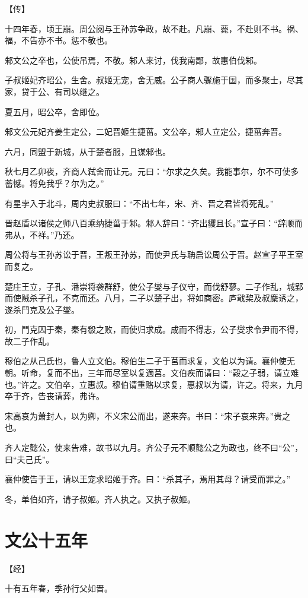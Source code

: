 \documentclass[a4paper,12pt,UTF8,twoside]{ctexbook}
\begin{document}
【传】

十四年春，顷王崩。周公阅与王孙苏争政，故不赴。凡崩、薨，不赴则不书。祸、福，不告亦不书。惩不敬也。

邾文公之卒也，公使吊焉，不敬。邾人来讨，伐我南鄙，故惠伯伐邾。

子叔姬妃齐昭公，生舍。叔姬无宠，舍无威。公子商人骤施于国，而多聚士，尽其家，贷于公、有司以继之。

夏五月，昭公卒，舍即位。

邾文公元妃齐姜生定公，二妃晋姬生捷菑。文公卒，邾人立定公，捷菑奔晋。

六月，同盟于新城，从于楚者服，且谋邾也。

秋七月乙卯夜，齐商人弑舍而让元。元曰：“尔求之久矣。我能事尔，尔不可使多蓄憾。将免我乎？尔为之。”

有星孛入于北斗，周内史叔服曰：“不出七年，宋、齐、晋之君皆将死乱。”

晋赵盾以诸侯之师八百乘纳捷菑于邾。邾人辞曰：“齐出貜且长。”宣子曰：“辞顺而弗从，不祥。”乃还。

周公将与王孙苏讼于晋，王叛王孙苏，而使尹氏与聃启讼周公于晋。赵宣子平王室而复之。

楚庄王立，子孔、潘崇将袭群舒，使公子燮与子仪守，而伐舒蓼。二子作乱，城郢而使贼杀子孔，不克而还。八月，二子以楚子出，将如商密。庐戢棃及叔麇诱之，遂杀鬥克及公子燮。

初，鬥克囚于秦，秦有殽之败，而使归求成。成而不得志，公子燮求令尹而不得，故二子作乱。

穆伯之从己氏也，鲁人立文伯。穆伯生二子于莒而求复，文伯以为请。襄仲使无朝。听命，复而不出，三年而尽室以复適莒。文伯疾而请曰：“穀之子弱，请立难也。”许之。文伯卒，立惠叔。穆伯请重赂以求复，惠叔以为请，许之。将来，九月卒于齐，告丧请葬，弗许。

宋高哀为萧封人，以为卿，不义宋公而出，遂来奔。书曰：“宋子哀来奔。”贵之也。

齐人定懿公，使来告难，故书以九月。齐公子元不顺懿公之为政也，终不曰“公”，曰“夫己氏”。

襄仲使告于王，请以王宠求昭姬于齐。曰：“杀其子，焉用其母？请受而罪之。”

冬，单伯如齐，请子叔姬。齐人执之。又执子叔姬。


\chapter{文公十五年}



【经】

十有五年春，季孙行父如晋。
\end{document}
